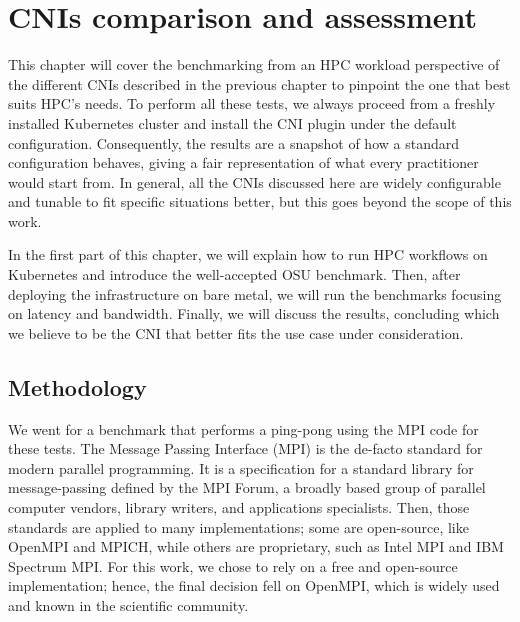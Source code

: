 \chapter{CNIs comparison and assessment}\label{chpt:osu}

This chapter will cover the benchmarking from an HPC workload perspective of the
different CNIs described in the previous chapter to pinpoint the one that best
suits HPC's needs.
To perform all these tests, we always proceed from a freshly installed
Kubernetes cluster and install the CNI plugin under the default configuration.
Consequently, the results are a snapshot of how a standard configuration
behaves, giving a fair representation of what every practitioner would start
from.
In general, all the CNIs discussed here are widely configurable and tunable to
fit specific situations better, but this goes beyond the scope of this work.

In the first part of this chapter, we will explain how to run HPC workflows on
Kubernetes and introduce the well-accepted OSU benchmark.
Then, after deploying the infrastructure on bare metal, we will run the
benchmarks focusing on latency and bandwidth. Finally, we will discuss the
results, concluding which we believe to be the CNI that better fits the use case
under consideration.

\section{Methodology}\label{sec:methodology}

We went for a benchmark that performs a ping-pong using the MPI code for these
tests.
The Message Passing Interface (MPI) \cite{mpi41} is the de-facto standard for
modern parallel programming.
It is a specification for a standard library for message-passing defined by the
MPI Forum, a broadly based group of parallel computer vendors, library writers,
and applications specialists.
Then, those standards are applied to many implementations; some are open-source,
like OpenMPI and MPICH, while others are proprietary, such as Intel MPI and IBM
Spectrum MPI.
For this work, we chose to rely on a free and open-source implementation; hence,
the final decision fell on OpenMPI, which is widely used and known in the
scientific community.


